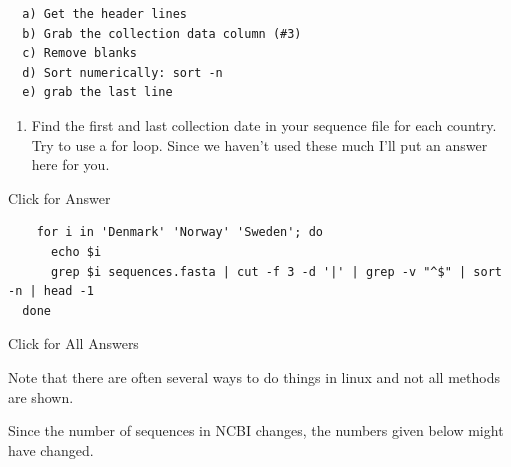 \documentclass[
]{book}
\providecommand{\tightlist}{%
  \setlength{\itemsep}{0pt}\setlength{\parskip}{0pt}}
\begin{document}
\begin{verbatim}
  a) Get the header lines
  b) Grab the collection data column (#3)
  c) Remove blanks
  d) Sort numerically: sort -n
  e) grab the last line
\end{verbatim}

\begin{enumerate}
\def\labelenumi{\arabic{enumi}.}
\setcounter{enumi}{9}
\tightlist
\item
  Find the first and last collection date in your sequence file for each country. Try to use a for loop. Since we haven't used these much I'll put an answer here for you.
\end{enumerate}

Click for Answer

\begin{verbatim}
    for i in 'Denmark' 'Norway' 'Sweden'; do
      echo $i
      grep $i sequences.fasta | cut -f 3 -d '|' | grep -v "^$" | sort -n | head -1
  done
\end{verbatim}

\hfill\break

Click for All Answers

Note that there are often several ways to do things in linux and not all methods are shown.

Since the number of sequences in NCBI changes, the numbers given below might have changed.
\end{document}
